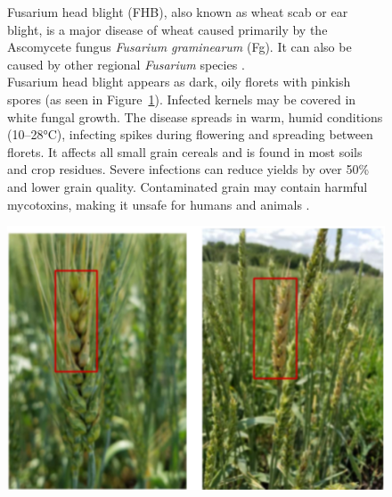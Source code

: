 \begin{figure}[H]
    \centering
    \begin{minipage}{0.55\textwidth}
        
        Fusarium head blight (FHB), also known as wheat scab or ear blight, is a major disease of wheat caused primarily by the Ascomycete fungus \textit{Fusarium graminearum} (Fg). It can also be caused by other regional \textit{Fusarium} species \parencite{figueroa2018review}.\\
        Fusarium head blight appears as dark, oily florets with pinkish spores (as seen in Figure~\ref{fig:Figure07}). Infected kernels may be covered in white fungal growth. The disease spreads in warm, humid conditions (10–28°C), infecting spikes during flowering and spreading between florets. It affects all small grain cereals and is found in most soils and crop residues. Severe infections can reduce yields by over 50\% and lower grain quality. Contaminated grain may contain harmful mycotoxins, making it unsafe for humans and animals \parencite{duveiller2012wheat}.
    \end{minipage}%
    \hfill
    \begin{minipage}{0.4\textwidth}
        \centering
        \includegraphics[width=0.95\linewidth]{chapters/chapter2/images/Figure07.png}
        \label{fig:Figure07}
    \end{minipage}
\end{figure}



